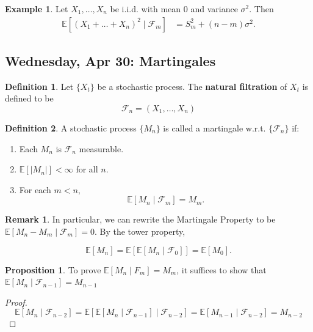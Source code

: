 \documentclass[10pt, oneside]{article}
\newcommand{\bbE}{\mathbb{E}}
\theoremstyle{definition}
\newtheorem{exmp}{Example}[section]
\newtheorem{defn}{Definition}
\newtheorem{prop}{Proposition}
\newtheorem{rem}{Remark}
\begin{document}
\begin{exmp}
    Let $X_1, \dots, X_n$ be i.i.d. with mean $0$ and variance $\sigma^2.$ Then 
    \begin{align*}
        \bbE[(X_1 + \dots + X_n)^2 \mid \mathcal{F}_m] &= S_m^2 + (n-m)\sigma^2.
    \end{align*}
\end{exmp}


\newpage
\subsection{Wednesday, Apr 30: Martingales}
\begin{defn}
    Let $\{X_t\}$ be a stochastic process. The \textbf{natural filtration} of $X_t$ is defined to be 
    \[\mathcal{F}_n = (X_1, \dots, X_n)\]
\end{defn}

\begin{defn}
    A stochastic process $\{M_n\}$ is called a martingale w.r.t. $\{\mathcal{F}_n\}$ if:
    \begin{enumerate}
        \item Each $M_n$ is $\mathcal{F}_n$ measurable.
        \item $\bbE[|M_n|] < \infty$ for all $n.$
        \item For each $m < n,$
        \[\bbE[M_n \mid \mathcal{F}_m] = M_m.\]
    \end{enumerate}
\end{defn}
\begin{rem}
    In particular, we can rewrite the Martingale Property to be $\bbE[M_n - M_m \mid \mathcal{F}_m] = 0.$ By the tower property, 

    \[\bbE[M_n] = \bbE[\bbE[M_n \mid \mathcal{F}_0]] = \bbE[M_0].\]
\end{rem}

\begin{prop}
    To prove $\bbE[M_n \mid F_m] = M_m$, it suffices to show that $\bbE[M_n \mid \mathcal{F}_{n-1}] = M_{n-1}$
\end{prop}
\begin{proof}
\[\bbE[M_n \mid \mathcal{F}_{n-2}] = \bbE[\bbE[M_n \mid \mathcal{F}_{n-1}]\mid \mathcal{F}_{n-2}] = \bbE[M_{n-1}\mid \mathcal{F}_{n-2}]= M_{n-2}\]
\end{proof}
\end{document}
